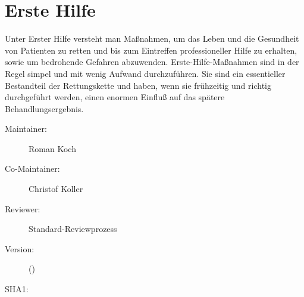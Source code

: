 \def\ChapterCode{EHI}
\chapter
[\CO{[\ChapterCode]} Erste Hilfe]
{Erste Hilfe}
\label{chp:EHI}


\ChapterIntro
{%
Unter Erster Hilfe versteht man Maßnahmen, um das Leben und
die Gesundheit von Patienten zu retten und bis zum
Eintreffen professioneller Hilfe zu erhalten, sowie um
bedrohende Gefahren abzuwenden. Erste-Hilfe-Maßnahmen sind
in der Regel simpel und mit wenig Aufwand durchzuführen. Sie
sind ein essentieller Bestandteil der Rettungskette und
haben, wenn sie frühzeitig und richtig durchgeführt werden,
einen enormen Einfluß auf das spätere Behandlungsergebnis. 
}
{%
\begin{description}
  \item[Maintainer:] Roman Koch
  \item[Co-Maintainer:] Christof Koller
  \item[Reviewer:] Standard-Reviewprozess
  \item[Version:] {\VarDocVersionTypeName} ({\VarDocVersionTypeDescription})
  \item[SHA1:] {\DocGitCommit}
\end{description}

{\TxTeilkapitelAASS}
}

\clearpage
\section{}


\subsection{}




